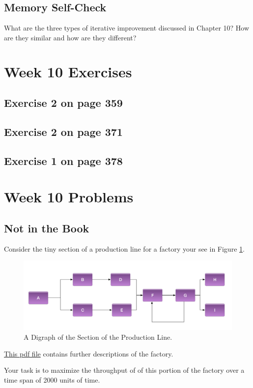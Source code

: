\documentclass[12pt]{amsart}
\begin{document}
\subsection{Memory Self-Check}
What are the three types of iterative improvement discussed in Chapter 10? How are they similar and how are they different?
 \section{Week 10 Exercises}
\subsection{ Exercise 2 on page 359}
\subsection{Exercise 2 on page 371} 
\subsection{Exercise 1 on page 378} 


\section{Week 10 Problems}
\subsection{Not in the Book}
Consider the tiny section of a production line for a factory your see in Figure \ref{fig:factory1}. 
\begin{figure}[htb]
  \includegraphics[width=\linewidth]{../support_files/tiny_factory.png}
  \caption{A Digraph of the Section of the Production Line.}
  \label{fig:factory1}
\end{figure}

\href{run:../support_files/tiny_factory_step_descriptions.pdf}{This pdf file} contains further descriptions of the factory.

Your task is to maximize the throughput of of this portion of the factory over a time span of 2000 units of time.
\end{document}
